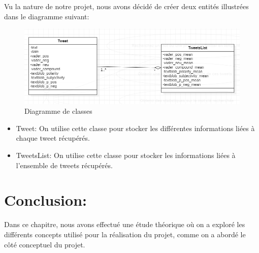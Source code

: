 Vu la nature de notre projet, nous avons décidé de créer deux entités illustrées dans le diagramme suivant:
\begin{figure}[H]
    \centering
    \includegraphics[width=\textwidth]{etude-theorique-conception/assets/classDiagram.png}
    \caption{Diagramme de classes}
    \label{fig:my_label}
\end{figure}
\begin{itemize}
    \item \textcolor{DispositionColor}{Tweet:} On utilise cette classe pour stocker les différentes informations liées à chaque tweet récupérés.
    \item \textcolor{DispositionColor}{TweetsList:} On utilise cette classe pour stocker les informations liées à l'ensemble de tweets récupérés.
\end{itemize}
\section{Conclusion:}
Dans ce chapitre, nous avons effectué une étude théorique où on a exploré les différents concepts utilisé pour la réalisation du projet, comme on a abordé le côté conceptuel du projet. 



